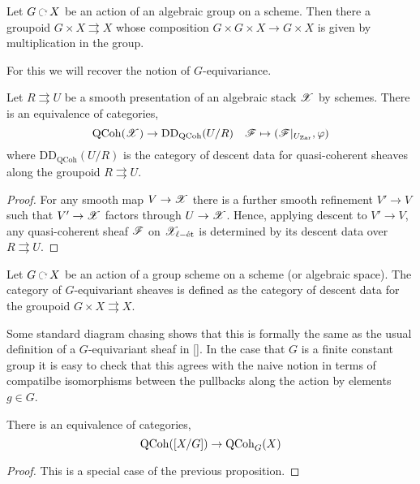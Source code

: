 \documentclass[12pt]{article}
\begin{document}
\begin{example}
Let $G \acts X$ be an action of an algebraic group on a scheme. Then there a groupoid $G \times X \rightrightarrows X$ whose composition $G \times G \times X \to G \times X$ is given by multiplication in the group. 

For this we will recover the notion of $G$-equivariance. 
\end{example}


\begin{prop}
Let $R \rightrightarrows U$ be a smooth presentation of an algebraic stack $\mathscr{X}$ by schemes. There is an equivalence of categories,
\[ \mathrm{QCoh}(\mathscr{X}) \to \mathrm{DD}_{\mathrm{QCoh}}(U/R) \quad \mathscr{F} \mapsto (\mathscr{F}|_{U_{\mathrm{Zar}}}, \varphi) \]
where $\mathrm{DD}_{\mathrm{QCoh}}(U/R)$ is the category of descent data for quasi-coherent sheaves along the groupoid $R \rightrightarrows U$.
\end{prop}

\begin{proof}
For any smooth map $V \to \mathscr{X}$ there is a further smooth refinement $V' \to V$ such that $V' \to \mathscr{X}$ factors through $U \to \mathscr{X}$. Hence, applying descent to $V' \to V$, any quasi-coherent sheaf $\mathscr{F}$ on $\mathscr{X}_{\ell-\text{\'{e}t}}$ is determined by its descent data over $R \rightrightarrows U$.
\end{proof}

\begin{defn}
Let $G \acts X$ be an action of a group scheme on a scheme (or algebraic space). The category of $G$-equivariant sheaves is defined as the category of descent data for the groupoid $G \times X \rightrightarrows X$.
\end{defn}

\begin{rmk}
Some standard diagram chasing shows that this is formally the same as the usual definition of a $G$-equivariant sheaf in []. In the case that $G$ is a finite constant group it is easy to check that this agrees with the naive notion in terms of compatilbe isomorphisms between the pullbacks along the action by elements $g \in G$. 
\end{rmk}

\begin{prop}
There is an equivalence of categories,
\[ \mathrm{QCoh}([X/G]) \to \mathrm{QCoh}_{G}(X) \]
\end{prop}

\begin{proof}
This is a special case of the previous proposition.
\end{proof}
\end{document}
